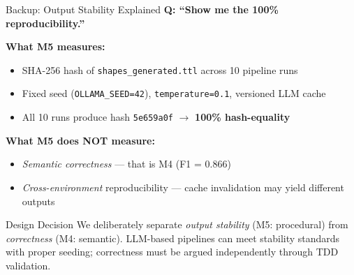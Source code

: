 \documentclass[aspectratio=169, 10pt]{beamer}
\begin{document}
\begin{frame}{Backup: Output Stability Explained}
    \textbf{Q: ``Show me the 100\% reproducibility.''}

    \vspace{0.2cm}
    \textbf{What M5 measures:}
    \begin{itemize}
        \item SHA-256 hash of \texttt{shapes\_generated.ttl} across 10 pipeline runs
        \item Fixed seed (\texttt{OLLAMA\_SEED=42}), \texttt{temperature=0.1}, versioned LLM cache
        \item All 10 runs produce hash \texttt{5e659a0f} $\rightarrow$ \textbf{100\% hash-equality}
    \end{itemize}

    \vspace{0.3cm}
    \textbf{What M5 does NOT measure:}
    \begin{itemize}
        \item \textit{Semantic correctness} --- that is M4 (F1 = 0.866)
        \item \textit{Cross-environment} reproducibility --- cache invalidation may yield different outputs
    \end{itemize}

    \vspace{0.3cm}
    \begin{alertblock}{Design Decision}
        We deliberately separate \textit{output stability} (M5: procedural) from \textit{correctness} (M4: semantic). LLM-based pipelines can meet stability standards with proper seeding; correctness must be argued independently through TDD validation.
    \end{alertblock}
\end{frame}
\end{document}
